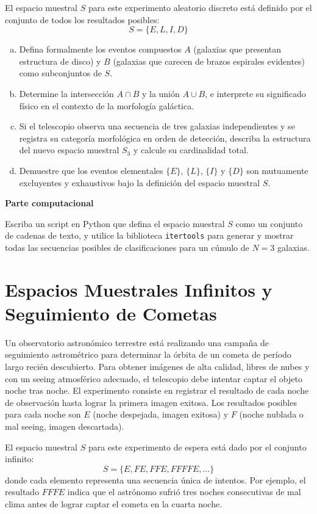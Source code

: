 \documentclass[a4paper]{article}
\begin{document}
El espacio muestral $S$ para este experimento aleatorio discreto está definido por el conjunto de todos los resultados posibles:
$$ S = \{E, L, I, D\} $$

\begin{enumerate}[a)]
\item Defina formalmente los eventos compuestos $A$ (galaxias que presentan estructura de disco) y $B$ (galaxias que carecen de brazos espirales evidentes) como subconjuntos de $S$.
\item Determine la intersección $A \cap B$ y la unión $A \cup B$, e interprete su significado físico en el contexto de la morfología galáctica.
\item Si el telescopio observa una secuencia de tres galaxias independientes y se registra su categoría morfológica en orden de detección, describa la estructura del nuevo espacio muestral $S_3$ y calcule su cardinalidad total.
\item Demuestre que los eventos elementales $\{E\}$, $\{L\}$, $\{I\}$ y $\{D\}$ son mutuamente excluyentes y exhaustivos bajo la definición del espacio muestral $S$.
\end{enumerate}

\textbf{Parte computacional}

Escriba un script en Python que defina el espacio muestral $S$ como un conjunto de cadenas de texto, y utilice la biblioteca \texttt{itertools} para generar y mostrar todas las secuencias posibles de clasificaciones para un cúmulo de $N=3$ galaxias.

\section{Espacios Muestrales Infinitos y Seguimiento de Cometas}
\label{sec:problema-03}

Un observatorio astronómico terrestre está realizando una campaña de seguimiento astrométrico para determinar la órbita de un cometa de período largo recién descubierto. Para obtener imágenes de alta calidad, libres de nubes y con un seeing atmosférico adecuado, el telescopio debe intentar captar el objeto noche tras noche. El experimento consiste en registrar el resultado de cada noche de observación hasta lograr la primera imagen exitosa. Los resultados posibles para cada noche son $E$ (noche despejada, imagen exitosa) y $F$ (noche nublada o mal seeing, imagen descartada).

El espacio muestral $S$ para este experimento de espera está dado por el conjunto infinito:
$$
S = \{E, FE, FFE, FFFFE, \dots\}
$$
donde cada elemento representa una secuencia única de intentos. Por ejemplo, el resultado $FFFE$ indica que el astrónomo sufrió tres noches consecutivas de mal clima antes de lograr captar el cometa en la cuarta noche.
\end{document}
